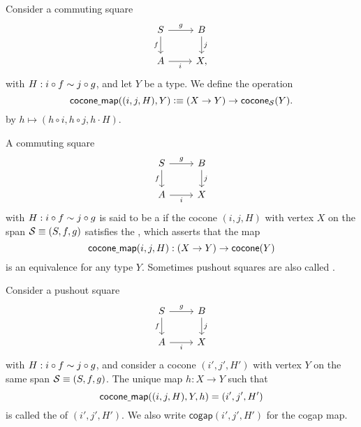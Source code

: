 \begin{defn}
Consider a commuting square
\begin{equation*}
\begin{tikzcd}
S \arrow[d,swap,"f"] \arrow[r,"g"] & B \arrow[d,"j"] \\
A \arrow[r,swap,"i"] & X,
\end{tikzcd}
\end{equation*}
with $H:i\circ f\sim j\circ g$, and let $Y$ be a type. We define the operation
\begin{equation*}
\mathsf{cocone\underline{\ }{}map}((i,j,H),Y) \vcentcolon\equiv (X\to Y) \to \mathsf{cocone}_{\mathcal{S}}(Y).
\end{equation*}
by $h\mapsto (h\circ i,h\circ j,h\cdot H)$. 
\end{defn}

\begin{defn}
A commuting square
\begin{equation*}
\begin{tikzcd}
S \arrow[r,"g"] \arrow[d,swap,"f"] & B \arrow[d,"j"] \\
A \arrow[r,swap,"i"] & X
\end{tikzcd}
\end{equation*}
with $H:i\circ f \sim j\circ g$ is said to be a  if the cocone $(i,j,H)$ with vertex $X$ on the span $\mathcal{S}\equiv (S,f,g)$
satisfies the , which asserts that the map
\begin{equation*}
\mathsf{cocone\underline{\ }{}map}(i,j,H):(X\to Y)\to \mathsf{cocone}(Y)
\end{equation*}
is an equivalence for any type $Y$. Sometimes pushout squares are also called .
\end{defn}

\begin{defn}
Consider a pushout square
\begin{equation*}
\begin{tikzcd}
S \arrow[r,"g"] \arrow[d,swap,"f"] & B \arrow[d,"j"] \\
A \arrow[r,swap,"i"] & X
\end{tikzcd}
\end{equation*}
with $H:i\circ f \sim j\circ g$, and consider a cocone $(i',j',H')$ with vertex $Y$ on the same span $\mathcal{S}\equiv(S,f,g)$. The unique map $h:X\to Y$ such that 
\begin{equation*}
\mathsf{cocone\underline{\ }{}map}((i,j,H),Y,h)= (i',j',H')
\end{equation*}
is called the  of $(i',j',H')$. We also write $\mathsf{cogap}(i',j',H')$ for the cogap map. 
\end{defn}

